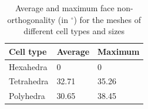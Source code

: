 \documentclass[sn-mathphys,Numbered]{sn-jnl}%
\begin{document}
\begin{table}[htb]
    \centering
    \begin{tabular}{lll}
        \hline
        Cell type & Average & Maximum \\
        \hline
        Hexahedra & 0 &0  \\
        Tetrahedra & 32.71 & 35.26 \\
        Polyhedra & 30.65 & 38.45 \\
        \hline
    \end{tabular}
    \caption{Average and maximum face non-orthogonality (in $^\circ$) for the meshes of different cell types and sizes}
    \label{tab:mmsMesh}
\end{table}
\end{document}

